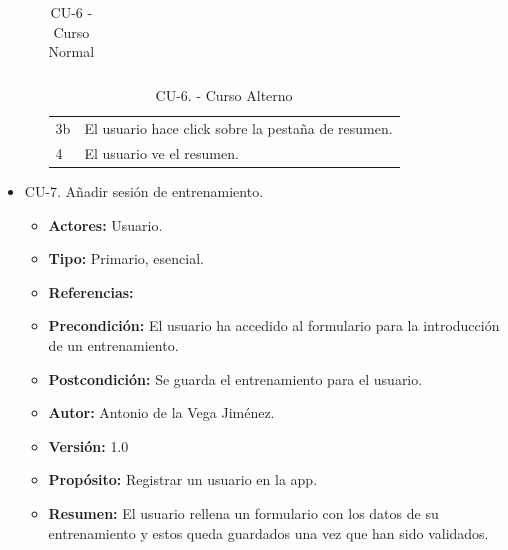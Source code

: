 \begin{itemize}
\begin{itemize}
\begin{table}[H]
\begin{tabularx}{\textwidth}{|l|X|l|X|}
      \end{tabularx}
      \caption{CU-6 - Curso Normal}
      \label{table-9}
    \end{table}
    \begin{table}[H]
      \centering
      \begin{tabularx}{\textwidth}{|l|X|}
       \hline
       \rowcolor[HTML]{C0C0C0} 
       \multicolumn{2}{|l|}{\cellcolor[HTML]{C0C0C0}Curso Alterno} \\ \hline
       \rowcolor[HTML]{FFFFFF} 
              3b                      & El usuario hace click sobre la pestaña de resumen.                            \\ \hline
              4                     & El usuario ve el resumen.                            \\ \hline
      \end{tabularx}
      \caption{CU-6. - Curso Alterno}
      \label{table-10}
    \end{table}
  \end{itemize}
  \item CU-7. Añadir sesión de entrenamiento.
  \begin{itemize}
    \item \textbf{Actores:} Usuario.
    \item \textbf{Tipo:} Primario, esencial.
    \item \textbf{Referencias:}
    \item \textbf{Precondición:} El usuario ha accedido al formulario para la introducción de un entrenamiento.
    \item \textbf{Postcondición:} Se guarda el entrenamiento para el usuario.
    \item \textbf{Autor:} Antonio de la Vega Jiménez.
    \item \textbf{Versión:} 1.0
    \item \textbf{Propósito:} Registrar un usuario en la app.
    \item \textbf{Resumen:} El usuario rellena un formulario con los datos de su entrenamiento y estos queda guardados una vez que han sido validados.
    \begin{table}[H]

\end{table}
\end{itemize}
\end{itemize}
